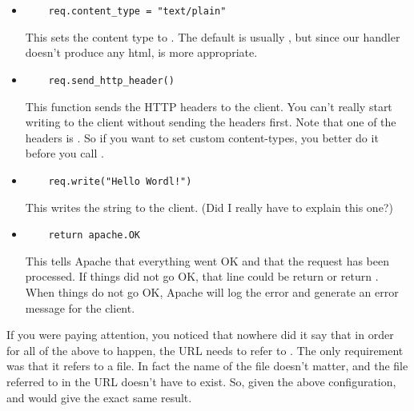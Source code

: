 \begin{enumerate}
\begin{itemize}
\item
\begin{verbatim}
    req.content_type = "text/plain"
\end{verbatim}

This sets the content type to . The default is usually
, but since our handler doesn't produce any html,
 is more appropriate.

\item
\begin{verbatim}
    req.send_http_header()
\end{verbatim}

This function sends the HTTP headers to the client. You can't really
start writing to the client without sending the headers first. Note
that one of the headers is . So if you want to set
custom content-types, you better do it before you call
.

\item
\begin{verbatim}
    req.write("Hello Wordl!")
\end{verbatim}

This writes the  string to the client. (Did I really
have to explain this one?)

\item
\begin{verbatim}
    return apache.OK
\end{verbatim}

This tells Apache that everything went OK and that the request has
been processed. If things did not go OK, that line could be return
 or return
. When things do not go OK, Apache
will log the error and generate an error message for the client.
\end{itemize}
\end{enumerate}

 If you were paying attention, you noticed that
nowhere did it say that in order for all of the above to happen, the
URL needs to refer to . The only requirement was
that it refers to a  file. In fact the name of the file doesn't
matter, and the file referred to in the URL doesn't have to exist. So,
given the above configuration,
 and
 would give the exact same
result.

